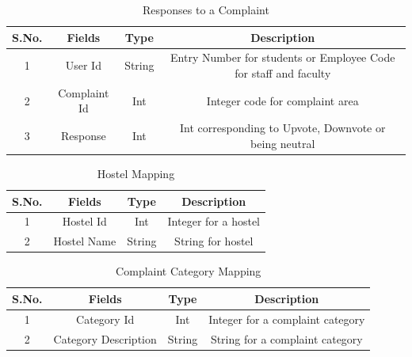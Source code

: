 \documentclass{article}
\begin{document}
\begin{table}[]
\centering
\caption{Responses to a Complaint}
\label{my-label}
\begin{tabular}{|c|c|c|c|}
\hline
\textbf{S.No.} & \textbf{Fields} & \textbf{Type} & \textbf{Description}                                             \\ \hline
1              & User Id         & String        & Entry Number for students or Employee Code for staff and faculty \\ \hline
2              & Complaint Id    & Int           & Integer code for complaint area                                  \\ \hline
3              & Response         & Int           & Int corresponding to Upvote, Downvote or being neutral           \\ \hline
\end{tabular}
\end{table}


\begin{table}[]
\centering
\caption{Hostel Mapping}
\label{my-label}
\begin{tabular}{|c|c|c|c|}
\hline
\textbf{S.No.} & \textbf{Fields} & \textbf{Type} & \textbf{Description} \\ \hline
1              & Hostel Id       & Int           & Integer for a hostel \\ \hline
2              & Hostel Name     & String        & String for hostel    \\ \hline
\end{tabular}
\end{table}



\begin{table}[]
\centering
\caption{Complaint Category Mapping}
\label{my-label}
\begin{tabular}{|c|c|c|c|}
\hline
\textbf{S.No.} & \textbf{Fields}      & \textbf{Type} & \textbf{Description}             \\ \hline
1              & Category Id          & Int           & Integer for a complaint category \\ \hline
2              & Category Description & String        & String for a complaint category  \\ \hline
\end{tabular}
\end{table}
\end{document}
